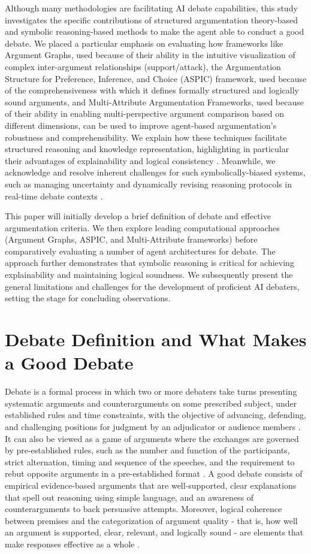 \documentclass[conference]{IEEEtran}
\begin{document}
Although many methodologies are facilitating AI debate capabilities, this study investigates the specific contributions of structured argumentation theory-based and symbolic reasoning-based methods to make the agent able to conduct a good debate. We placed a particular emphasis on evaluating how frameworks like Argument Graphs, used because of their ability in the intuitive visualization of complex inter-argument relationships (support/attack), the Argumentation Structure for Preference, Inference, and Choice (ASPIC) framework, used because of the comprehensiveness with which it defines formally structured and logically sound arguments, and Multi-Attribute Argumentation Frameworks, used because of their ability in enabling multi-perspective argument comparison based on different dimensions, can be used to improve agent-based argumentation's robustness and comprehensibility. We explain how these techniques facilitate structured reasoning and knowledge representation, highlighting in particular their advantages of explainability and logical consistency \cite{kasif2024trilogy}. Meanwhile, we acknowledge and resolve inherent challenges for such symbolically-biased systems, such as managing uncertainty and dynamically revising reasoning protocols in real-time debate contexts \cite{kasif2024trilogy}.

This paper will initially develop a brief definition of debate and effective argumentation criteria. We then explore leading computational approaches (Argument Graphs, ASPIC, and Multi-Attribute frameworks) before comparatively evaluating a number of agent architectures for debate. The approach further demonstrates that symbolic reasoning is critical for achieving explainability and maintaining logical soundness. We subsequently present the general limitations and challenges for the development of proficient AI debaters, setting the stage for concluding observations.

\section{Debate Definition and What Makes a Good Debate}
Debate is a formal process in which two or more debaters take turns presenting systematic arguments and counterarguments on some prescribed subject, under established rules and time constraints, with the objective of advancing, defending, and challenging positions for judgment by an adjudicator or audience members \cite{rakshit2019debbie}\cite{tan2016winning}. It can also be viewed as a game of arguments where the exchanges are governed by pre-established rules, such as the number and function of the participants, strict alternation, timing and sequence of the speeches, and the requirement to rebut opposite arguments in a pre-established format \cite{engelmann2022argumentation}. A good debate consists of empirical evidence-based arguments that are well-supported, clear explanations that spell out reasoning using simple language, and an awareness of counterarguments to back persuasive attempts. Moreover, logical coherence between premises and the categorization of argument quality - that is, how well an argument is supported, clear, relevant, and logically sound - are elements that make responses effective as a whole \cite{engelmann2022argumentation}.
\end{document}
